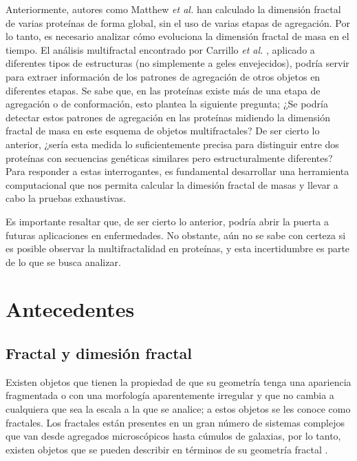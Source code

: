\documentclass[11pt]{article}
\begin{document}
Anteriormente, autores como Matthew \textit{et al.} \cite{Enright2005} han calculado la dimensi\'{o}n fractal de varias prote\'{i}nas de forma global, sin el uso de varias etapas de agregaci\'{o}n. Por lo tanto, es necesario analizar c\'{o}mo evoluciona la dimensi\'{o}n fractal de masa en el tiempo. El an\'{a}lisis multifractal encontrado por Carrillo \textit{et al.} \cite{Carrillo2003}, aplicado a diferentes tipos de estructuras (no simplemente a geles envejecidos), podr\'{i}a servir para extraer informaci\'{o}n de los patrones de agregaci\'{o}n de otros objetos en diferentes etapas. Se sabe que, en las prote\'{i}nas existe m\'{a}s de una etapa de agregaci\'{o}n o de conformaci\'{o}n, esto plantea la siguiente pregunta; ¿Se podr\'{i}a detectar estos patrones de agregaci\'{o}n en las prote\'{i}nas midiendo la dimensi\'{o}n fractal de masa en este esquema de objetos multifractales? De ser cierto lo anterior, ¿ser\'{i}a esta medida lo suficientemente precisa para distinguir entre dos prote\'{i}nas con secuencias gen\'{e}ticas similares pero estructuralmente diferentes? Para responder a estas interrogantes, es fundamental desarrollar una herramienta computacional que nos permita calcular la dimesi\'{o}n fractal de masas y llevar a cabo la pruebas exhaustivas.

Es importante resaltar que, de ser cierto lo anterior, podr\'{i}a abrir la puerta a futuras aplicaciones en enfermedades. No obstante, a\'{u}n no se sabe con certeza si es posible observar la multifractalidad en prote\'{i}nas, y esta incertidumbre es parte de lo que se busca analizar.


\section{Antecedentes}

\subsection{Fractal y dimesi\'{o}n fractal}
\label{subsec:subseccion2.1}


Existen objetos que tienen la propiedad de que su geometr\'{i}a tenga una apariencia fragmentada o con una morfolog\'{i}a aparentemente irregular y que no cambia a cualquiera que sea la escala a la que se analice; a estos objetos se les conoce como fractales. Los fractales est\'{a}n presentes en un gran n\'{u}mero de sistemas complejos que van desde agregados microsc\'{o}picos hasta c\'{u}mulos de galaxias, por lo tanto, existen objetos que se pueden describir en t\'{e}rminos de su geometr\'{i}a fractal \cite{Vicsek1992}. 
\end{document}
